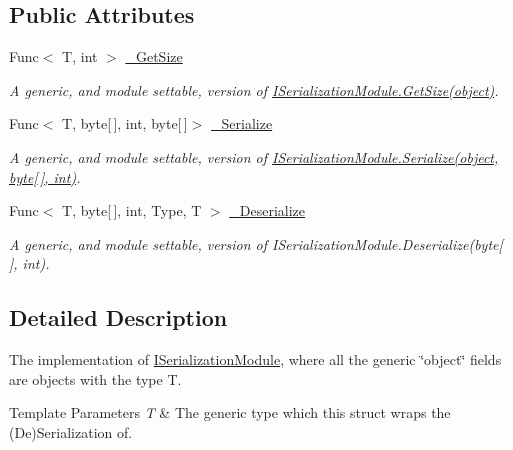 \subsection*{Public Attributes}
\begin{DoxyCompactItemize}
\item 
Func$<$ T, int $>$ \hyperlink{class_bit_serialize_attribute_1_1_serialization_module_3_01_t_01_4_ae7b34baf697be55e822689dddd3d8dca}{\-\_\-\-Get\-Size}
\begin{DoxyCompactList}\small\item\em A generic, and module settable, version of \hyperlink{interface_bit_serialize_attribute_1_1_i_serialization_module_a057ba8b3168eb8a0999a329cca222cea}{I\-Serialization\-Module.\-Get\-Size(object)}. \end{DoxyCompactList}\item 
Func$<$ T, byte\mbox{[}$\,$\mbox{]}, int, byte\mbox{[}$\,$\mbox{]}$>$ \hyperlink{class_bit_serialize_attribute_1_1_serialization_module_3_01_t_01_4_a2e3a228e7b2cfe75c555a69c859f6564}{\-\_\-\-Serialize}
\begin{DoxyCompactList}\small\item\em A generic, and module settable, version of \hyperlink{interface_bit_serialize_attribute_1_1_i_serialization_module_ad3b3d5f329538f550958a8342d9e0708}{I\-Serialization\-Module.\-Serialize(object, byte\mbox{[}$\,$\mbox{]}, int)}. \end{DoxyCompactList}\item 
Func$<$ T, byte\mbox{[}$\,$\mbox{]}, int, Type, T $>$ \hyperlink{class_bit_serialize_attribute_1_1_serialization_module_3_01_t_01_4_a888f4fda944e93208eddd2368b2ed5a2}{\-\_\-\-Deserialize}
\begin{DoxyCompactList}\small\item\em A generic, and module settable, version of I\-Serialization\-Module.\-Deserialize(byte\mbox{[}$\,$\mbox{]}, int). \end{DoxyCompactList}\end{DoxyCompactItemize}


\subsection{Detailed Description}
The implementation of \hyperlink{interface_bit_serialize_attribute_1_1_i_serialization_module}{I\-Serialization\-Module}, where all the generic \char`\"{}object\char`\"{} fields are objects with the type T. 


\begin{DoxyTemplParams}{Template Parameters}
{\em T} & The generic type which this struct wraps the (De)Serialization of.\\
\hline
\end{DoxyTemplParams}


